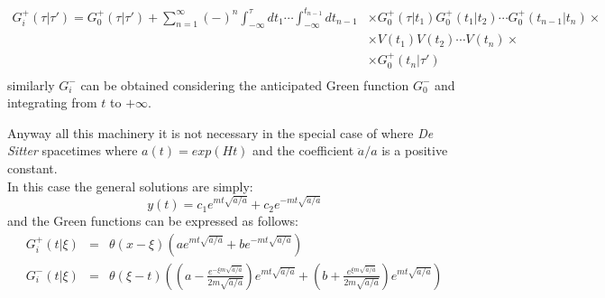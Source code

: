 \documentclass[Main]{subfiles}
\begin{document}
			\begin{align*}
				G^+_i ( \tau \vert \tau' ) = G^+_0( \tau \vert \tau' ) + \sum_{n=1}^\infty (-)^n 
				\int_{-\infty}^\tau dt_1 \cdots \int_{-\infty}^{t_{n-1}} dt_{n-1} 
				& \times	  G^+_0(\tau \vert t_1) G^+_0(t_1\vert t_2) \cdots G^+_0(t_{n-1} \vert t_n) \times \\
				& \times  V(t_1) V(t_2) \cdots V(t_n) \times \\
				& \times  G^+_0 (t_n \vert \tau' ) \\
			\end{align*}		
			similarly $G^-_i$  can be obtained considering the anticipated Green function $G^-_0$ and integrating from $t$ to $+\infty$.
			
			\vspace{2mm}
		Anyway all this machinery it is not necessary in the special case of where \emph{De Sitter} spacetimes where $ a(t) = exp(H t)$ and the coefficient $\ddot{a}/a$ is a positive constant.  \cite{Wald1984}\\
		In this case the general solutions are simply:
		\begin{displaymath}
		 y(t) = c_1 e^{m t \sqrt{\ddot{a}/a}} + c_2 e^{-m t \sqrt{\ddot{a}/a}}
		\end{displaymath}
		and the Green functions can be expressed as follows:
			\begin{eqnarray*}
				G^+_i(t \vert \xi) &=& \theta( x - \xi) \left(a e^{m t \sqrt{\ddot{a}/a}} + b e^{-m t \sqrt{\ddot{a}/a}}\right) \\
				G^-_i( t \vert \xi) &=& \theta(\xi -t) \left( 
				\left(a-\frac{e^{-\xi m \sqrt{\ddot{a}/a}}}{2 m \sqrt{\ddot{a}/a}} \right) e^{m t \sqrt{\ddot{a}/a}}+
				\left(b +\frac{e^{\xi m \sqrt{\ddot{a}/a}}}{2 m \sqrt{\ddot{a}/a}} \right) e^{m t \sqrt{\ddot{a}/a}}			
				\right)
			\end{eqnarray*}
\end{document}
